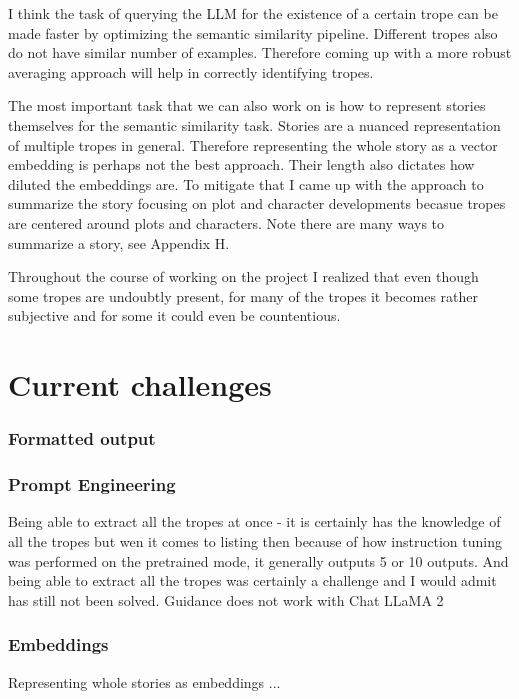 \documentclass[11pt]{article}
\begin{document}
I think the task of querying the LLM for the existence of a certain trope can be made faster by optimizing the semantic similarity pipeline. Different tropes also do not have similar number of examples. Therefore coming up with a more robust averaging approach will help in correctly identifying tropes.

The most important task that we can also work on is how to represent stories themselves for the semantic similarity task. Stories are a nuanced representation of multiple tropes in general. Therefore representing the whole story as a vector embedding is perhaps not the best approach. Their length also dictates how diluted the embeddings are. To mitigate that I came up with the approach to summarize the story focusing on plot and character developments becasue tropes are centered around plots and characters. Note there are many ways to summarize a story, see Appendix H.

Throughout the course of working on the project I realized that even though some tropes are undoubtly present, for many of the tropes it becomes rather subjective and for some it could even be countentious.

\section{Current challenges}
\subsubsection{Formatted output}
\subsubsection{Prompt Engineering}
Being able to extract all the tropes at once - it is certainly has the knowledge of all the tropes but wen it comes to listing then because of how instruction tuning was performed on the pretrained mode, it generally outputs 5 or 10 outputs. And being able to extract all the tropes was certainly a challenge and I would admit has still not been solved. 
Guidance does not work with Chat LLaMA 2
\subsubsection{Embeddings}
Representing whole stories as embeddings ...

\printbibliography
\clearpage
\appendix
\end{document}
